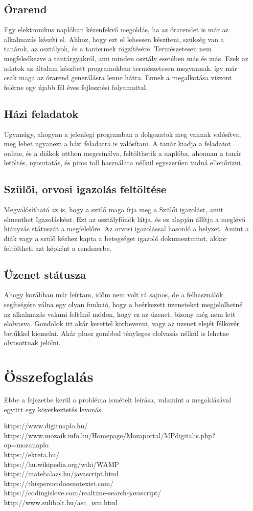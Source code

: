 \documentclass[
]{thesis-ekf}
\begin{document}
\section{Órarend}
Egy elektronikus naplóban kézenfekvő megoldás, ha az órarendet is már az alkalmazás készíti el. Ahhoz, hogy ezt el lehessen készíteni, szükség van a tanárok, az osztályok, és a tantermek rögzítésére. Természetesen nem megfeledkezve a tantárgyakról, ami minden osztály esetében más és más. Ezek az adatok az általam készített programokban természetesen megvannak, így már csak maga az órarend generálásra lenne hátra. Ennek a megalkotása viszont felérne egy újabb fél éves fejlesztési folyamattal.
\section{Házi feladatok}
Ugyanúgy, ahogyan a jelenlegi programban a dolgozatok meg vannak valósítva, meg lehet ugyanezt a házi feladatra is valósítani. A  tanár kiadja a feladatot online, és a diákok otthon megcsinálva, feltölthetik a naplóba, ahonnan a tanár letöltés, nyomtatás, és piros toll használata nélkül egyszerűen tudná ellenőrizni. 
\section{Szülői, orvosi igazolás feltöltése}
Megvalósítható az is, hogy a szülő maga írja meg a Szülői igazolást, amit elmenthet Igazolásként. Ezt az osztályfőnök látja, és ez alapján állítja a meglévő hiányzás státuszát a megfelelőre. Az orvosi igazolással hasonló a helyzet. Amint a diák vagy a szülő kézhez kapta a betegséget igazoló dokumentumot, akkor feltöltheti azt képként a rendszerbe.
\section{Üzenet státusza}
Ahogy korábban már leírtam, időm nem volt rá sajnos, de a felhasználók segítségére válna egy olyan funkció, hogy a beérkezett üzeneteket megjelölhetné az alkalmazás valami feltűnő módon, hogy ez az üzenet, bizony még nem lett elolvasva. Gondolok itt akár kerettel körbevenni, vagy az üzenet elejét félkövér betűkkel kiemelni. Akár plusz gombbal tényleges elolvasás nélkül is lehetne olvasottnak jelölni.
\chapter{Összefoglalás}
Ebbe a fejezetbe kerül a probléma ismételt leírása, valamint a megoldásával együtt egy következtetés levonás.
\begin{thebibliography}{}
	https://www.digitnaplo.hu/\\
	https://www.mozaik.info.hu/Homepage/Mozaportal/MPdigitalis.php?op=mozanaplo\\
	https://ekreta.hu/\\
	https://hu.wikipedia.org/wiki/WAMP\\
	https://matebalazs.hu/javascript.html\\
	https://thispersondoesnotexist.com/ \\
	https://codingislove.com/realtime-search-javascript/\\
	http://www.sulibolt.hu/asc\_ism.html
\end{thebibliography}
\end{document}
